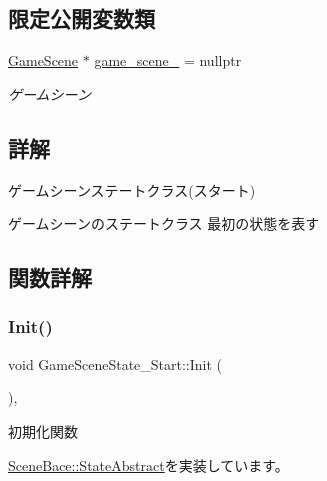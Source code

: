 \subsection*{限定公開変数類}
\begin{DoxyCompactItemize}
\item 
\mbox{\hyperlink{class_game_scene}{Game\+Scene}} $\ast$ \mbox{\hyperlink{class_game_scene_state___start_af9389c7c8496419a6a4a3d3339acd94f}{game\+\_\+scene\+\_\+}} = nullptr
\begin{DoxyCompactList}\small\item\em ゲームシーン \end{DoxyCompactList}\end{DoxyCompactItemize}


\subsection{詳解}
ゲームシーンステートクラス(スタート) 

ゲームシーンのステートクラス 最初の状態を表す 

\subsection{関数詳解}
\mbox{\label{class_game_scene_state___start_ae921c57f349fbb2f00a197d40a3404b7}} 
\subsubsection{\texorpdfstring{Init()}{Init()}}
{\footnotesize\ttfamily void Game\+Scene\+State\+\_\+\+Start\+::\+Init (\begin{DoxyParamCaption}{ }\end{DoxyParamCaption})\hspace{0.3cm}{\ttfamily [override]}, {\ttfamily [virtual]}}



初期化関数 



\mbox{\hyperlink{class_scene_bace_1_1_state_abstract_ae2846ccd263265142324b43bfac813ff}{Scene\+Bace\+::\+State\+Abstract}}を実装しています。

\mbox{\label{class_game_scene_state___start_a59270f7b65613f580864ed8ea3056179}} 
